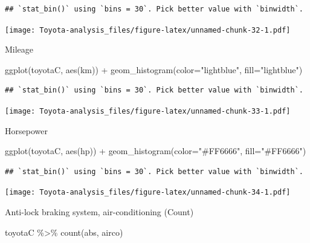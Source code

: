 \documentclass[
]{article}
\newenvironment{Shaded}{\begin{snugshade}}{\end{snugshade}}
\newcommand{\AttributeTok}[1]{\textcolor[rgb]{0.77,0.63,0.00}{#1}}
\newcommand{\FunctionTok}[1]{\textcolor[rgb]{0.00,0.00,0.00}{#1}}
\newcommand{\NormalTok}[1]{#1}
\newcommand{\SpecialCharTok}[1]{\textcolor[rgb]{0.00,0.00,0.00}{#1}}
\newcommand{\StringTok}[1]{\textcolor[rgb]{0.31,0.60,0.02}{#1}}
\begin{document}
\begin{verbatim}
## `stat_bin()` using `bins = 30`. Pick better value with `binwidth`.
\end{verbatim}

\texttt{[image: Toyota-analysis\_files/figure-latex/unnamed-chunk-32-1.pdf]}

Mileage

\begin{Shaded}
\begin{Highlighting}[]
\FunctionTok{ggplot}\NormalTok{(toyotaC, }\FunctionTok{aes}\NormalTok{(km)) }\SpecialCharTok{+} \FunctionTok{geom\_histogram}\NormalTok{(}\AttributeTok{color=}\StringTok{"lightblue"}\NormalTok{, }\AttributeTok{fill=}\StringTok{"lightblue"}\NormalTok{) }
\end{Highlighting}
\end{Shaded}

\begin{verbatim}
## `stat_bin()` using `bins = 30`. Pick better value with `binwidth`.
\end{verbatim}

\texttt{[image: Toyota-analysis\_files/figure-latex/unnamed-chunk-33-1.pdf]}

Horsepower

\begin{Shaded}
\begin{Highlighting}[]
\FunctionTok{ggplot}\NormalTok{(toyotaC, }\FunctionTok{aes}\NormalTok{(hp)) }\SpecialCharTok{+} \FunctionTok{geom\_histogram}\NormalTok{(}\AttributeTok{color=}\StringTok{"\#FF6666"}\NormalTok{, }\AttributeTok{fill=}\StringTok{"\#FF6666"}\NormalTok{) }
\end{Highlighting}
\end{Shaded}

\begin{verbatim}
## `stat_bin()` using `bins = 30`. Pick better value with `binwidth`.
\end{verbatim}

\texttt{[image: Toyota-analysis\_files/figure-latex/unnamed-chunk-34-1.pdf]}

Anti-lock braking system, air-conditioning (Count)

\begin{Shaded}
\begin{Highlighting}[]
\NormalTok{toyotaC }\SpecialCharTok{\%\textgreater{}\%} 
  \FunctionTok{count}\NormalTok{(abs, airco)}
\end{Highlighting}
\end{Shaded}
\end{document}
